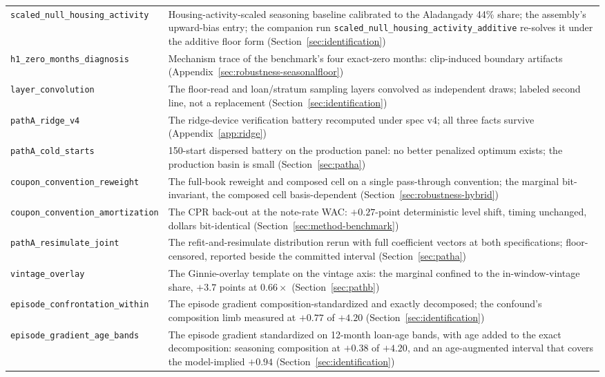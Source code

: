 \documentclass[12pt]{article}
\begin{document}
{\begin{longtable}{@{}p{5.4cm}p{8.8cm}@{}}
\texttt{scaled\_null\_housing\_activity} & Housing-activity-scaled seasoning baseline calibrated to the Aladangady 44\% share; the assembly's upward-bias entry; the companion run \texttt{scaled\_null\_housing\_activity\_additive} re-solves it under the additive floor form (Section~\ref{sec:identification}) \\
\texttt{h1\_zero\_months\_diagnosis} & Mechanism trace of the benchmark's four exact-zero months: clip-induced boundary artifacts (Appendix~\ref{sec:robustness-seasonalfloor}) \\
\texttt{layer\_convolution} & The floor-read and loan/stratum sampling layers convolved as independent draws; labeled second line, not a replacement (Section~\ref{sec:identification}) \\
\texttt{pathA\_ridge\_v4} & The ridge-device verification battery recomputed under spec v4; all three facts survive (Appendix~\ref{app:ridge}) \\
\texttt{pathA\_cold\_starts} & 150-start dispersed battery on the production panel: no better penalized optimum exists; the production basin is small (Section~\ref{sec:patha}) \\
\texttt{coupon\_convention\_reweight} & The full-book reweight and composed cell on a single pass-through convention; the marginal bit-invariant, the composed cell basis-dependent (Section~\ref{sec:robustness-hybrid}) \\
\texttt{coupon\_convention\_amortization} & The CPR back-out at the note-rate WAC: $+0.27$-point deterministic level shift, timing unchanged, dollars bit-identical (Section~\ref{sec:method-benchmark}) \\
\texttt{pathA\_resimulate\_joint} & The refit-and-resimulate distribution rerun with full coefficient vectors at both specifications; floor-censored, reported beside the committed interval (Section~\ref{sec:patha}) \\
\texttt{vintage\_overlay} & The Ginnie-overlay template on the vintage axis: the marginal confined to the in-window-vintage share, $+3.7$ points at $0.66\times$ (Section~\ref{sec:pathb}) \\
\texttt{episode\_confrontation\_within} & The episode gradient composition-standardized and exactly decomposed; the confound's composition limb measured at $+0.77$ of $+4.20$ (Section~\ref{sec:identification}) \\ \texttt{episode\_gradient\_age\_bands} & The episode gradient standardized on 12-month loan-age bands, with age added to the exact decomposition: seasoning composition at $+0.38$ of $+4.20$, and an age-augmented interval that covers the model-implied $+0.94$ (Section~\ref{sec:identification}) \\

\end{longtable}}
\end{document}
